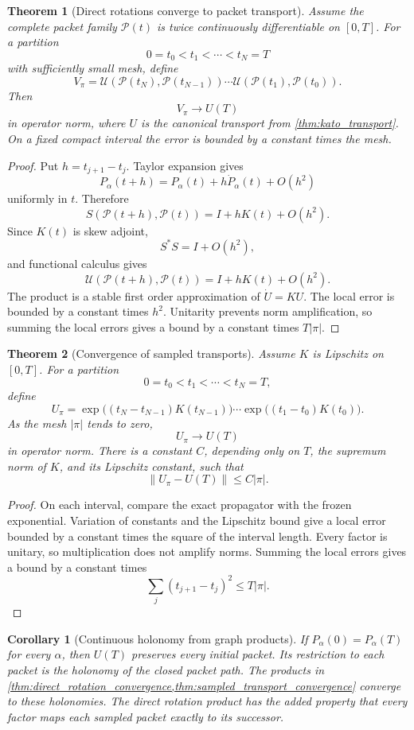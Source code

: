 \documentclass{aomart}
\newtheorem{theorem}{Theorem}[section]
\newtheorem{corollary}[corollary]{Corollary}
\theoremstyle{definition}
\theoremstyle{remark}
\newcommand{\Pcal}{\mathcal P}
\newcommand{\Ucal}{\mathcal U}
\begin{document}
\begin{theorem}[Direct rotations converge to packet transport]\label{thm:direct_rotation_convergence}
Assume the complete packet family $\Pcal(t)$ is twice continuously differentiable on $[0,T]$.  For a partition
\[
0=t_0<t_1<\cdots<t_N=T
\]
with sufficiently small mesh, define
\[
V_\pi
=
\Ucal(\Pcal(t_N),\Pcal(t_{N-1}))
\cdots
\Ucal(\Pcal(t_1),\Pcal(t_0)).
\]
Then
\[
V_\pi\longrightarrow U(T)
\]
in operator norm, where $U$ is the canonical transport from \cref{thm:kato_transport}.  On a fixed compact interval the error is bounded by a constant times the mesh.
\end{theorem}

\begin{proof}
Put $h=t_{j+1}-t_j$.  Taylor expansion gives
\[
P_\alpha(t+h)=P_\alpha(t)+h\dot P_\alpha(t)+O(h^2)
\]
uniformly in $t$.  Therefore
\[
S(\Pcal(t+h),\Pcal(t))
=
I+hK(t)+O(h^2).
\]
Since $K(t)$ is skew adjoint,
\[
S^*S=I+O(h^2),
\]
and functional calculus gives
\[
\Ucal(\Pcal(t+h),\Pcal(t))
=
I+hK(t)+O(h^2).
\]
The product is a stable first order approximation of $\dot U=KU$.  The local error is bounded by a constant times $h^2$.  Unitarity prevents norm amplification, so summing the local errors gives a bound by a constant times $T|\pi|$.
\end{proof}

\begin{theorem}[Convergence of sampled transports]\label{thm:sampled_transport_convergence}
Assume $K$ is Lipschitz on $[0,T]$.  For a partition
\[
0=t_0<t_1<\cdots<t_N=T,
\]
define
\[
U_\pi
=
\exp\big((t_N-t_{N-1})K(t_{N-1})\big)
\cdots
\exp\big((t_1-t_0)K(t_0)\big).
\]
As the mesh $|\pi|$ tends to zero,
\[
U_\pi\longrightarrow U(T)
\]
in operator norm.  There is a constant $C$, depending only on $T$, the supremum norm of $K$, and its Lipschitz constant, such that
\[
\|U_\pi-U(T)\|
\le C|\pi|.
\]
\end{theorem}

\begin{proof}
On each interval, compare the exact propagator with the frozen exponential.  Variation of constants and the Lipschitz bound give a local error bounded by a constant times the square of the interval length.  Every factor is unitary, so multiplication does not amplify norms.  Summing the local errors gives a bound by a constant times
\[
\sum_j(t_{j+1}-t_j)^2
\le
T|\pi|.
\]
\end{proof}

\begin{corollary}[Continuous holonomy from graph products]\label{cor:continuous_holonomy}
If $P_\alpha(0)=P_\alpha(T)$ for every $\alpha$, then $U(T)$ preserves every initial packet.  Its restriction to each packet is the holonomy of the closed packet path.  The products in \cref{thm:direct_rotation_convergence,thm:sampled_transport_convergence} converge to these holonomies.  The direct rotation product has the added property that every factor maps each sampled packet exactly to its successor.
\end{corollary}
\end{document}
